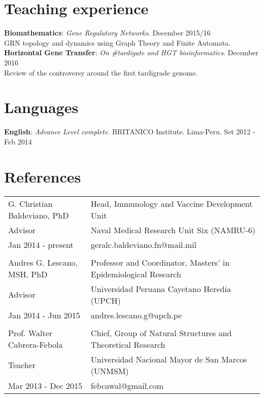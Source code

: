 \documentclass[margin,line]{res}
\begin{document}
\begin{resume}
\section{\sc Teaching experience}
{\bf Biomathematics}: {\em Gene Regulatory Networks}. \hfill {December 2015/16}\\ GRN topology and dynamics using Graph Theory and Finite Automata. \\[4pt] %
{\bf Horizontal Gene Transfer}: {\em On \#tardigate and HGT bioinformatics}. \hfill {December 2016}\\ 
Review of the controversy around the first tardigrade genome. \\


\section{\sc Languages}
{\bf English}: {\em Advance Level complete}. BRITANICO Institute. Lima-Peru. \hfill {Set 2012 - Feb 2014} \\

\section{\sc References }

\begin{tabular}{ l l }
	G. Christian Baldeviano, PhD & Head, Immunology and Vaccine Development Unit \\
	Advisor & Naval Medical Research Unit Six (NAMRU-6)\\
	Jan 2014 - present & geralc.baldeviano.fn@mail.mil\\
	&\\
	Andres G. Lescano, MSH, PhD & Professor and Coordinator, Masters' in Epidemiological Research\\
	Advisor & Universidad Peruana Cayetano Heredia (UPCH)\\
	Jan 2014 - Jun 2015 & andres.lescano.g@upch.pe\\
	&\\
	Prof. Walter Cabrera-Febola & Chief, Group of Natural Structures and Theoretical Research \\
	Teacher & Universidad Nacional Mayor de San Marcos (UNMSM)\\
	Mar 2013 - Dec 2015 & febcawal@gmail.com\\	
\end{tabular}


\end{resume}
\end{document}
